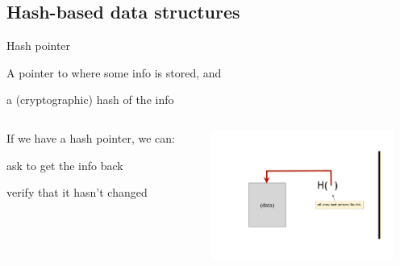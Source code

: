 \subsection{Hash-based data structures}

\begin{frame}{Hash pointer}

\begin{definition}
\BI
\item A pointer to where some info is stored, and
\item a (cryptographic) hash of the info
\EI
\end{definition}

\begin{columns}
\begin{column}{0.5\textwidth}
If we have a hash pointer, we can:
\BI
\item ask to get the info back
\item verify that it hasn't changed
\EI
\end{column}	
\begin{column}{0.5\textwidth}
\begin{center}
\includegraphics[width=6cm]{hash-pointer}	
\end{center}
\end{column}	
\end{columns}	
	
\end{frame}

